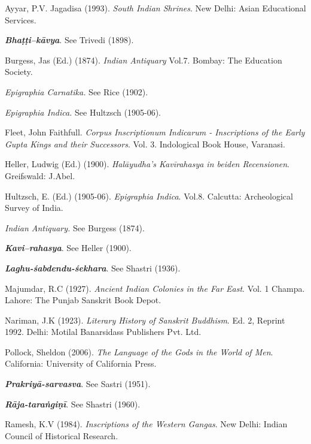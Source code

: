 \begin{thebibliography}{99}
\itemsep=2pt
Ayyar, P.V. Jagadisa (1993). {\sl South Indian Shrines}. New Delhi: Asian Educational Services. 

{\sl\bfseries Bhaṭṭi--kāvya}. See Trivedi (1898).

Burgess, Jas (Ed.) (1874). {\sl Indian Antiquary} Vol.7. Bombay: The Education Society.

{\sl Epigraphia Carnatika.} See Rice (1902). 

{\sl Epigraphia Indica.} See Hultzsch (1905-06). 

Fleet, John Faithfull. {\sl Corpus Inscriptionum Indicarum - Inscriptions of the Early Gupta Kings and their Successors}. Vol. 3. Indological Book House, Varanasi.

Heller, Ludwig (Ed.) (1900). {\sl Halāyudha's Kavīrahasya in beiden Recensionen}. Greifswald: J.Abel.

Hultzsch, E. (Ed.) (1905-06). {\sl Epigraphia Indica}. Vol.8. Calcutta: Archeological Survey of India.

{\sl Indian Antiquary.} See Burgess (1874).

{\sl\bfseries Kavi--rahasya}. See Heller (1900). 

{\sl\bfseries Laghu-śabdendu-śekhara}. See Shastri (1936).

Majumdar, R.C (1927). {\sl Ancient Indian Colonies in the Far East}. Vol. 1 Champa. Lahore: The Punjab Sanskrit Book Depot. 

Nariman, J.K (1923). {\sl Literary History of Sanskrit Buddhism}. Ed. 2, Reprint 1992. Delhi: Motilal Banarsidass Publishers Pvt. Ltd. 

Pollock, Sheldon (2006). {\sl The Language of the Gods in the World of Men}. California: University of California Press. 

{\sl\bfseries Prakriyā-sarvasva}. See Sastri (1951).

{\sl\bfseries Rāja-taraṅgiṇī}. See Shastri (1960).

Ramesh, K.V (1984). {\sl Inscriptions of the Western Gangas}. New Delhi: Indian Council of Historical Research.


\end{thebibliography}
